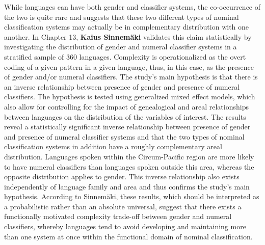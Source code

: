 \documentclass[output=collectionpaper]{langsci/langscibook}
\begin{document}
While languages can have both gender and classifier systems, the co-occurrence of the two is quite rare and suggests that these two different types of nominal classification systems may actually be in complementary distribution with one another. In Chapter 13, \textbf{Kaius Sinnemäki} validates this claim statistically by investigating the distribution of gender and numeral classifier systems in a stratified sample of 360 languages. Complexity is operationalized as the overt coding of a given pattern in a given language, thus, in this case, as the presence of gender and/or numeral classifiers. The study’s main hypothesis is that there is an inverse relationship between presence of gender and presence of numeral classifiers. The hypothesis is tested using generalized mixed effect models, which also allow for controlling for the impact of genealogical and areal relationships between languages on the distribution of the variables of interest. The results reveal a statistically significant inverse relationship between presence of gender and presence of numeral classifier systems and that the two types of nominal classification systems in addition have a roughly complementary areal distribution. Languages spoken within the Circum-Pacific region are more likely to have numeral classifiers than languages spoken outside this area, whereas the opposite distribution applies to gender. This inverse relationship also exists independently of language family and area and thus confirms the study’s main hypothesis. According to Sinnemäki, these results, which should be interpreted as a probabilistic rather than an absolute universal, suggest that there exists a functionally motivated complexity trade-off between gender and numeral classifiers, whereby languages tend to avoid developing and maintaining more than one system at once within the functional domain of nominal classification.
\end{document}
